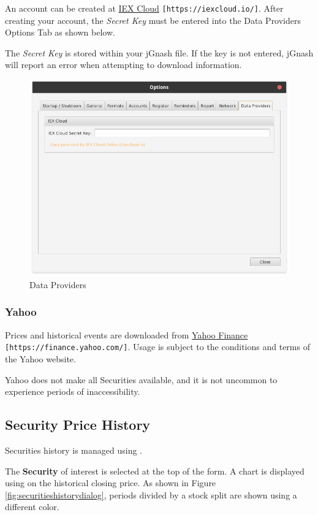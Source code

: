 \documentclass[letterpaper,12pt]{book}
\begin{document}
    An account can be created at \href{https://iexcloud.io/}{IEX Cloud} \texttt{[https://iexcloud.io/]}.
    After creating your account, the \textit{Secret Key} must be entered into the Data Providers Options Tab
    as shown below.  
    
    The \textit{Secret Key} is stored within your jGnash file.  If the key is not entered,
    jGnash will report an error when attempting to download information.
    
    \begin{figure}[h]
        \caption{Data Providers}
        \includegraphics[width=0.6\linewidth]{images/dataProvidersTab}
    \end{figure}
    
    \subsubsection{Yahoo}
    Prices and historical events are downloaded from \href{https://finance.yahoo.com/}{Yahoo Finance} \texttt{[https://finance.yahoo.com/]}.
    Usage is subject to the conditions and terms of the Yahoo website.
    
    Yahoo does not make all Securities available, and it is not uncommon to experience periods of inaccessibility.
    
    \subsection{Security Price History}
    
    Securities history is managed using .
    
    The \textbf{Security} of interest is selected at the top of the form.
    A chart is displayed using on the historical closing price.  
    As shown in Figure \ref{fig:securitieshistorydialog}, periods divided by a stock split 
    are shown using a different color.
    
\end{document}
